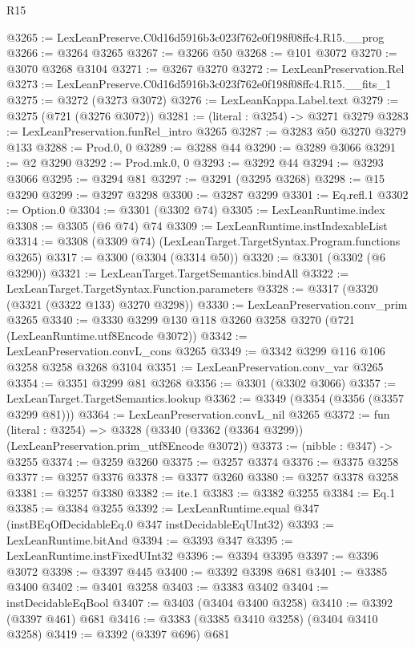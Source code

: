 \begin{lexlean}{R15}
\begin{coremodule}
@3265 := LexLeanPreserve.C0d16d5916b3c023f762e0f198f08ffc4.R15.__prog
@3266 := @3264 @3265
@3267 := @3266 @50
@3268 := @101 @3072
@3270 := @3070 @3268 @3104
@3271 := @3267 @3270
@3272 := LexLeanPreservation.Rel
@3273 := LexLeanPreserve.C0d16d5916b3c023f762e0f198f08ffc4.R15.__fits_1
@3275 := @3272 (@3273 @3072)
@3276 := LexLeanKappa.Label.text
@3279 := @3275 (@721 (@3276 @3072))
@3281 := (literal : @3254) -> @3271 @3279
@3283 := LexLeanPreservation.funRel_intro @3265
@3287 := @3283 @50 @3270 @3279 @133
@3288 := Prod.{0, 0}
@3289 := @3288 @44
@3290 := @3289 @3066
@3291 := @2 @3290
@3292 := Prod.mk.{0, 0}
@3293 := @3292 @44
@3294 := @3293 @3066
@3295 := @3294 @81
@3297 := @3291 (@3295 @3268)
@3298 := @15 @3290
@3299 := @3297 @3298
@3300 := @3287 @3299
@3301 := Eq.refl.{1}
@3302 := Option.{0}
@3304 := @3301 (@3302 @74)
@3305 := LexLeanRuntime.index
@3308 := @3305 (@6 @74) @74
@3309 := LexLeanRuntime.instIndexableList
@3314 := @3308 (@3309 @74) (LexLeanTarget.TargetSyntax.Program.functions @3265)
@3317 := @3300 (@3304 (@3314 @50))
@3320 := @3301 (@3302 (@6 @3290))
@3321 := LexLeanTarget.TargetSemantics.bindAll
@3322 := LexLeanTarget.TargetSyntax.Function.parameters
@3328 := @3317 (@3320 (@3321 (@3322 @133) @3270 @3298))
@3330 := LexLeanPreservation.conv_prim @3265
@3340 := @3330 @3299 @130 @118 @3260 @3258 @3270 (@721 (LexLeanRuntime.utf8Encode @3072))
@3342 := LexLeanPreservation.convL_cons @3265
@3349 := @3342 @3299 @116 @106 @3258 @3258 @3268 @3104
@3351 := LexLeanPreservation.conv_var @3265
@3354 := @3351 @3299 @81 @3268
@3356 := @3301 (@3302 @3066)
@3357 := LexLeanTarget.TargetSemantics.lookup
@3362 := @3349 (@3354 (@3356 (@3357 @3299 @81)))
@3364 := LexLeanPreservation.convL_nil @3265
@3372 := fun (literal : @3254) =>
  @3328 (@3340 (@3362 (@3364 @3299)) (LexLeanPreservation.prim_utf8Encode @3072))
@3373 := (nibble : @347) -> @3255
@3374 := @3259 @3260
@3375 := @3257 @3374
@3376 := @3375 @3258
@3377 := @3257 @3376
@3378 := @3377 @3260
@3380 := @3257 @3378 @3258
@3381 := @3257 @3380
@3382 := ite.{1}
@3383 := @3382 @3255
@3384 := Eq.{1}
@3385 := @3384 @3255
@3392 := LexLeanRuntime.equal @347 (instBEqOfDecidableEq.{0} @347 instDecidableEqUInt32)
@3393 := LexLeanRuntime.bitAnd
@3394 := @3393 @347
@3395 := LexLeanRuntime.instFixedUInt32
@3396 := @3394 @3395
@3397 := @3396 @3072
@3398 := @3397 @445
@3400 := @3392 @3398 @681
@3401 := @3385 @3400
@3402 := @3401 @3258
@3403 := @3383 @3402
@3404 := instDecidableEqBool
@3407 := @3403 (@3404 @3400 @3258)
@3410 := @3392 (@3397 @461) @681
@3416 := @3383 (@3385 @3410 @3258) (@3404 @3410 @3258)
@3419 := @3392 (@3397 @696) @681

\end{coremodule}
\end{lexlean}
